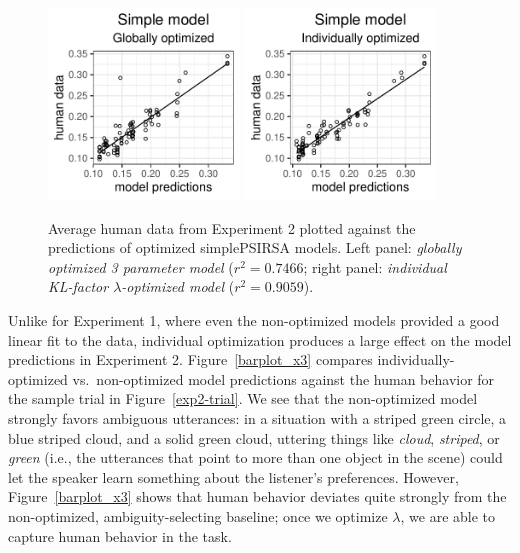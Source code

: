 \documentclass[11pt,a4paper]{article}
\begin{document}
\begin{figure}[ht]
	\centering
	\includegraphics[width=2in]{images/x3_m24.pdf}
	\includegraphics[width=2in]{images/x3_m11.pdf}
	\caption{Average human data from Experiment 2 plotted against the predictions of optimized simplePSIRSA models.
		Left panel: \emph{globally optimized 3 parameter model} ($r^{2}=0.7466$;
		right panel: \emph{individual KL-factor $\lambda$-optimized model} ($r^{2}=0.9059$). }
	\label{global-individual-x3}
\end{figure}


Unlike for Experiment 1, where even the non-optimized models provided a good linear fit to the data, individual optimization produces a large effect on the model predictions in Experiment 2.
Figure~\ref{barplot_x3} compares individually-optimized vs.~non-optimized model predictions against the human behavior for the sample trial in Figure~\ref{exp2-trial}.
We see that the non-optimized model strongly favors ambiguous utterances: in a situation with a striped green circle, a blue striped cloud, and a solid green cloud, uttering things like \textit{cloud}, \textit{striped}, or \textit{green} (i.e., the utterances that point to more than one object in the scene) could let the speaker learn something about the listener's preferences.
However, Figure~\ref{barplot_x3} shows that human behavior deviates quite strongly from the non-optimized, ambiguity-selecting baseline; once we optimize $\lambda$, we are able to capture human behavior in the task.
\end{document}
